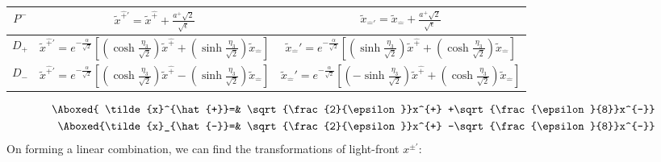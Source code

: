 \documentclass[]{article}
\numberwithin{equation}{section}
\begin{document}
{{\begin{table}[h!]
{\begin{tabular}{|c|c|c|}
             \hline
              \rule{0pt}{16pt}$P^{-}$ & $\tilde{x}^{\hat{+}\prime}= \tilde{x}^{\hat{+}}+\frac{a^{+}\sqrt{2}}{\sqrt{\epsilon}}$ & $\tilde{x}_{\hat{-}\prime}= \tilde{x}_{\hat{-}}+\frac{a^{+}\sqrt{2}}{\sqrt{\epsilon}}$\\
             \hline
             \rule{0pt}{16pt}$D_{+}$ & $\tilde{x}^{\hat{+}\prime}= e^{-\frac{\alpha}{\sqrt{2}}}\left[(\cosh{\frac{\eta_{3}}{\sqrt{2}}})\tilde{x}^{\hat{+}}+(\sinh{\frac{\eta_{3}}{\sqrt{2}}})\tilde{x}_{\hat{-}}\right]$ & $\tilde{x}_{\hat{-}}'=e^{-\frac{\alpha}{\sqrt{2}}}\left[(\sinh{\frac{\eta_{3}}{\sqrt{2}}})\tilde{x}^{\hat{+}}+(\cosh{\frac{\eta_{3}}{\sqrt{2}}})\tilde{x}_{\hat{-}}\right]$\\
             \hline
              \rule{0pt}{16pt}$D_{-}$ & $\tilde{x}^{\hat{+}\prime}= e^{-\frac{\alpha}{\sqrt{2}}}\left[(\cosh{\frac{\eta_{3}}{\sqrt{2}}})\tilde{x}^{\hat{+}}-(\sinh{\frac{\eta_{3}}{\sqrt{2}}})\tilde{x}_{\hat{-}}\right]$ & $\tilde{x}_{\hat{-}}'=e^{-\frac{\alpha}{\sqrt{2}}}\left[(-\sinh{\frac{\eta_{3}}{\sqrt{2}}})\tilde{x}^{\hat{+}}+(\cosh{\frac{\eta_{3}}{\sqrt{2}}})\tilde{x}_{\hat{-}}\right]$\\
             \hline
        \end{tabular}}
        \label{tab:my_label}
\end{table}
\begin{align}
   \Aboxed{ \tilde{x}^{\hat{+}}=& \sqrt{\frac{2}{\epsilon}}x^{+} +\sqrt{\frac{\epsilon}{8}}x^{-}}\\
     \Aboxed{\tilde{x}_{\hat{-}}=& \sqrt{\frac{2}{\epsilon}}x^{+}  -\sqrt{\frac{\epsilon}{8}}x^{-}}
\end{align}
On forming a linear combination, we can find the transformations of light-front $x^{\pm\prime}$:
\begin{table}[h!]
        \centering
\end{table}}}
\end{document}
